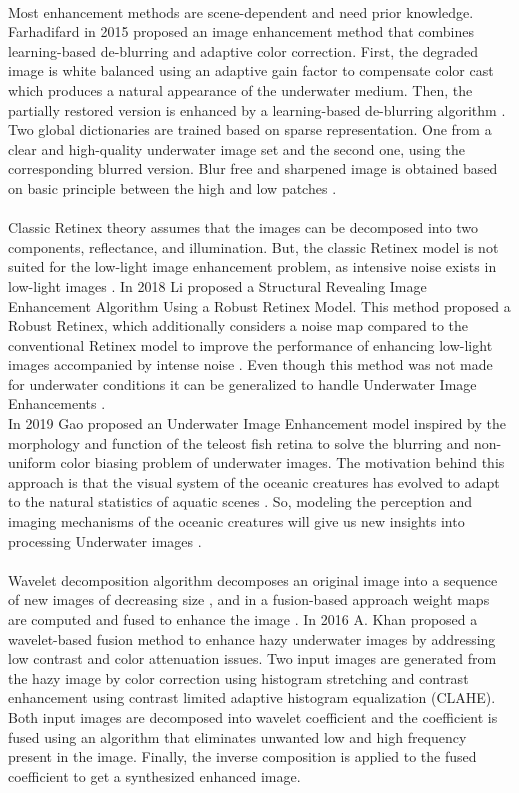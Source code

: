 \documentclass[a4paper,11pt,oneside]{article}
\begin{document}
  \\
  Most enhancement methods are scene-dependent and need prior knowledge. Farhadifard \cite{14} in 2015 proposed an image enhancement method that combines learning-based de-blurring and adaptive color correction. First, the degraded image is white balanced using an adaptive gain factor to compensate color cast which produces a natural appearance of the underwater medium. Then, the partially restored version is enhanced by a learning-based de-blurring algorithm \cite{14}. Two global dictionaries are trained based on sparse representation. One from a clear and high-quality underwater image set and the second one, using the corresponding blurred version. Blur free and sharpened image is obtained based on basic principle between the high and low patches \cite{14}.\\
  \\
    Classic Retinex theory assumes that the images can be decomposed into two components, reflectance, and illumination. But, the classic Retinex model is not suited for the low-light image enhancement problem, as intensive noise exists in low-light images \cite{5}. In 2018 Li \cite{5} proposed a Structural Revealing Image Enhancement Algorithm Using a Robust Retinex Model. This method proposed a Robust Retinex, which additionally considers a noise map compared to the conventional Retinex model to improve the performance of enhancing low-light images accompanied by intense noise \cite{5}. Even though this method was not made for underwater conditions it can be generalized to handle Underwater Image Enhancements \cite{5}.\\
  In 2019 Gao \cite{6} proposed an Underwater Image Enhancement model inspired by the morphology and function of the teleost fish retina to solve the blurring and non-uniform color biasing problem of underwater images. The motivation behind this approach is that the visual system of the oceanic creatures has evolved to adapt to the natural statistics of aquatic scenes \cite{6}. So, modeling the perception and imaging mechanisms of the oceanic creatures will give us new insights into processing Underwater images \cite{6}.\\
  \\
   Wavelet decomposition algorithm decomposes an original image into a sequence of new images of decreasing size \cite{24}, and in a fusion-based approach weight maps are computed and fused to enhance the image \cite{10}.  In 2016 A. Khan \cite{9} proposed a wavelet-based fusion method to enhance hazy underwater images by addressing low contrast and color attenuation issues. Two input images are generated from the hazy image by color correction using histogram stretching and contrast enhancement using contrast limited adaptive histogram equalization (CLAHE). Both input images are decomposed into wavelet coefficient and the coefficient is fused using an algorithm that eliminates unwanted low and high frequency present in the image. Finally, the inverse composition is applied to the fused coefficient to get a synthesized enhanced image. \cite{9}\\
\end{document}
